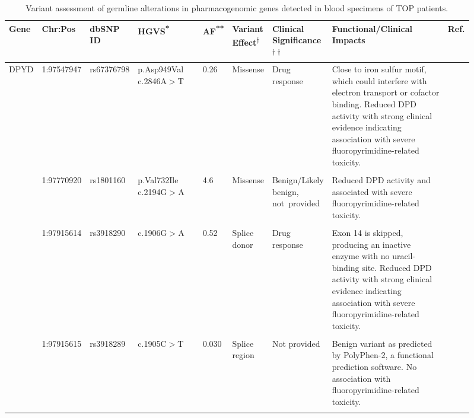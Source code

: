 \begin{landscape}

\begin{longtable}{p{0.07\linewidth}|p{0.09\linewidth}p{0.085\linewidth}p{0.14\linewidth}p{0.05\linewidth}p{0.065\linewidth}p{0.11\linewidth}p{0.25\linewidth}p{0.05\linewidth}}
	\caption{Variant assessment of germline alterations in pharmacogenomic genes detected in blood specimens of TOP patients.}
	\label{tbl:germline_pgx_genes}
	\\
	\hline
	Gene & Chr:Pos & dbSNP ID & HGVS\textsuperscript{*} & AF\textsuperscript{**} & Variant Effect\textsuperscript{$\dagger$} & Clinical Significance\textsuperscript{$\dagger\dagger$} & Functional/Clinical Impacts & Ref.
	\\
	\hline
	DPYD & 1:97547947 & rs67376798 & p.Asp949Val c.2846A$>$T & 0.26 & Missense & Drug response
	&
	 Close to iron sulfur motif, which could interfere with electron transport or cofactor binding. Reduced DPD activity with strong clinical evidence indicating association with severe fluoropyrimidine-related toxicity.
	&
	\cite{VanKuilenburg2016, Toffoli2015, Lee2014, Deenen2011, Kuilenburg2000, Swen2011, Caudle2013, Amstutz2009, Schwab2008, Morel2006, Mattison2002, Dobritzsch2001, Boige2016, Offer2014, Meulendijks2015}
	\\
	\\
	& 1:97770920 & rs1801160 & p.Val732Ile c.2194G$>$A & 4.6 & Missense & Benign/Likely benign, \mbox{not provided} & Reduced DPD activity and associated with severe fluoropyrimidine-related toxicity. & \cite{Schwab2008, Kuilenburg2000, Gentile2016, Deenen2011, Boige2016, VanKuilenburg2016}
	\\
	\\
	& 1:97915614 & rs3918290 & c.1906G$>$A & 0.52 & Splice donor & Drug response & Exon 14 is skipped, producing an inactive enzyme with no uracil-binding site. Reduced DPD activity with strong clinical evidence indicating association with severe fluoropyrimidine-related toxicity. & \cite{Toffoli2015, Lee2014, Caudle2013, Swen2011, Kuilenburg2000, Deenen2011, Amstutz2009, Schwab2008, Morel2006, Gentile2016, VanKuilenburg2016, Meulendijks2015}
	\\
	\\
	& 1:97915615 & rs3918289 & c.1905C$>$T & 0.030 & Splice region & Not provided & Benign variant as predicted by PolyPhen-2, a functional prediction software. No association with fluoropyrimidine-related toxicity. & \cite{Boige2016, Offer2014}
	\\
	\\

\end{longtable}
\end{landscape}
